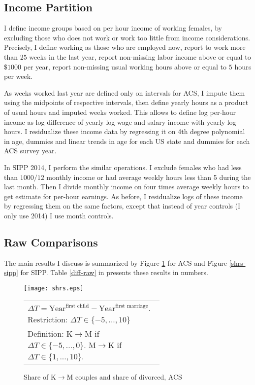 \documentclass[12pt,letter]{article}
\begin{document}

\subsection{Income Partition\label{inc-part}}
I define income groups based on per hour income of working females, by excluding those who does not work or work too little from income considerations. Precisely, I define working as those who are employed now, report to work more than 25 weeks in the last year, report non-missing labor income above or equal to $\$1000$ per year, report non-missing usual working hours above or equal to $5$ hours per week.

As weeks worked last year are defined only on intervals for ACS, I impute them using the midpoints of respective intervals, then define yearly hours as a product of usual hours and imputed weeks worked. This allows to define log per-hour income as log-difference of yearly log wage and salary income with yearly log hours. I residualize these income data by regressing it on 4th degree polynomial in age, dummies and linear trends in age for each US state and dummies for each ACS survey year.

In SIPP 2014, I perform the similar operations. I exclude females who had less than $1000/12$ monthly income or had average weekly hours less than 5 during the last month. Then I divide monthly income on four times average weekly hours to get estimate for per-hour earnings. As before, I residualize logs of these income by regressing them on the same factors, except that instead of year controls (I only use 2014) I use month controls.

\subsection{Raw Comparisons\label{keycomp}}
The main results I discuss is summarized by Figure \ref{shrs} for ACS and Figure \ref{shrs-sipp} for SIPP. Table \ref{diff-raw} in presents these results in numbers.


\begin{figure}[h!]
\centering
\texttt{[image: shrs.eps]}
\begin{tabular}{|p{0.65\linewidth}|}
\hline
\footnotesize $\Delta T = \text{Year}^{\text{first child}} - \text{Year}^{\text{first marriage}}$. Restriction: $\Delta T \in \{-5,...,10\}$\\
\footnotesize Definition: K$\to$M if $\Delta T \in \{-5,...,0\}$. M$\to$K if $\Delta T \in \{1,...,10\}$.\\\hline
\end{tabular}
\caption{Share of K$\to$M couples and share of divorced, ACS\label{shrs}}
\end{figure}
\end{document}
